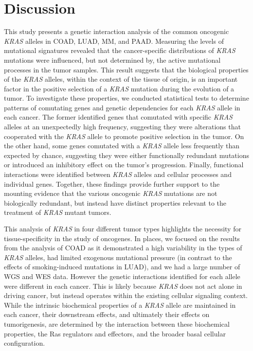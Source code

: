 \documentclass[english, 10pt, letterpaper]{article}
\newcommand{\KRAS}{\emph{KRAS}}
\begin{document}
\section*{Discussion}

This study presents a genetic interaction analysis of the common oncogenic \KRAS{} alleles in COAD, LUAD, MM, and PAAD.
Measuring the levels of mutational signatures revealed that the cancer-specific distributions of \KRAS{} mutations were influenced, but not determined by, the active mutational processes in the tumor samples.
This result suggests that the biological properties of the \KRAS{} alleles, within the context of the tissue of origin, is an important factor in the positive selection of a \KRAS{} mutation during the evolution of a tumor.
To investigate these properties, we conducted statistical tests to determine patterns of comutating genes and genetic dependencies for each \KRAS{} allele in each cancer.
The former identified genes that comutated with specific \KRAS{} alleles at an unexpectedly high frequency, suggesting they were alterations that cooperated with the \KRAS{} allele to promote positive selection in the tumor.
On the other hand, some genes comutated with a \KRAS{} allele less frequently than expected by chance, suggesting they were either functionally redundant mutations or introduced an inhibitory effect on the tumor's progression.
Finally, functional interactions were identified between \KRAS{} alleles and cellular processes and individual genes.
Together, these findings provide further support to the mounting evidence that the various oncogenic \KRAS{} mutations are not biologically redundant, but instead have distinct properties relevant to the treatment of \KRAS{} mutant tumors.

This analysis of \KRAS{} in four different tumor types highlights the necessity for tissue-specificity in the study of oncogenes.
In places, we focused on the results from the analysis of COAD as it demonstrated a high variability in the types of \KRAS{} alleles, had limited exogenous mutational pressure (in contrast to the effects of smoking-induced mutations in LUAD), and we had a large number of WGS and WES data.
However the genetic interactions identified for each allele were different in each cancer.
This is likely because \KRAS{} does not act alone in driving cancer, but instead operates within the existing cellular signaling context.
While the intrinsic biochemical properties of a \KRAS{} allele are maintained in each cancer, their downstream effects, and ultimately their effects on tumorigenesis, are determined by the interaction between these biochemical properties, the Ras regulators and effectors, and the broader basal cellular configuration.
\end{document}
